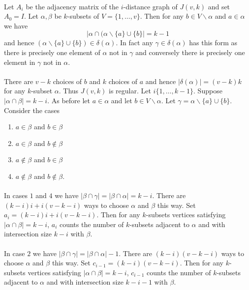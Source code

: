 \documentclass[letterpaper,12pt,oneside,onecolumn]{article}
\newcommand{\1}{\mathbbm{1}}
\begin{document}
\paragraph{}
Let $A_i$ be the adjacency matrix of the $i$-distance graph of $J(v,k)$ and set $A_0 = I$. Let $\alpha, \beta$ be $k$-subsets of $V = \{1, \dots, v\}$. Then for any $b \in V \backslash \alpha$ and $a \in \alpha$ we have
$$|\alpha \cap (\alpha \backslash \{a\} \cup \{b\}| = k -1$$
and hence $(\alpha \backslash \{a\} \cup \{b\}) \in \delta(\alpha)$. In fact any $\gamma \in \delta(\alpha)$ has this form as there is precisely one element of $\alpha$ not in $\gamma$ and conversely there is precisely one element in $\gamma$ not in $\alpha$.
\paragraph{}
There are $v-k$ choices of $b$ and $k$ choices of $a$ and hence $|\delta(\alpha)| = (v-k)k$ for any $k$-subset $\alpha$. Thus $J(v,k)$ is regular. Let $i \{1,\dots, k-1\}$. Suppose $|\alpha \cap \beta| = k-i$. As before let $a \in \alpha$ and let $b \in V \backslash \alpha$. Let $\gamma = \alpha \backslash\{a\} \cup \{b\}$. Consider the cases
\begin{enumerate}
\item $a \in \beta$ and $b \in \beta$
\item $a \in \beta$ and $b \not\in \beta$
\item $a\not\in \beta$ and $b\in \beta$
\item $a\not\in \beta$ and $b \not\in \beta$.
\end{enumerate}
\paragraph{}
In cases $1$ and $4$ we have $|\beta \cap \gamma | = |\beta \cap \alpha| = k-i$. There are $(k-i)i + i(v-k-i)$ ways to choose $\alpha$ and $\beta$ this way. Set $a_i = (k-i)i + i(v-k-i)$. Then for any $k$-subsets vertices satisfying $|\alpha \cap \beta| = k-i$, $a_i$ counts the number of $k$-subsets adjacent to $\alpha$ and with intersection size $k-i$ with $\beta$.
\paragraph{}
In case $2$ we have $|\beta \cap \gamma | = |\beta \cap \alpha| -1$. There are $(k-i)(v-k-i)$ ways to choose $\alpha$ and $\beta$ this way. Set $c_{i-1} = (k-i)(v-k-i)$. Then for any $k$-subsets vertices satisfying $|\alpha \cap \beta| = k-i$, $c_{i-1}$ counts the number of $k$-subsets adjacent to $\alpha$ and with intersection size $k-i-1$ with $\beta$.
\end{document}
